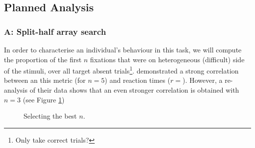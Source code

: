 \documentclass[a4paper, oneside, 11pt, onecolumn]{article}
\begin{document}
\subsection{Planned Analysis}

\subsubsection{A: Split-half array search}

In order to characterise an individual's behaviour in this task, we will compute the proportion of the first $n$ fixations that were on heterogeneous (difficult) side of the stimuli, over all target absent trials\footnote{Only take correct trials?}. \cite{nowakowsak2017} demonstrated a strong correlation between an this metric (for $n=5$) and reaction times ($r=$). However, a re-analysis of their data shows that an even stronger correlation is obtained with $n=3$ (see Figure \ref{fig:nowakowskaBestN})

\begin{figure}
\centering
{}
\caption{Selecting the best $n$.}
\label{fig:nowakowskaBestN}
\end{figure}
\end{document}
